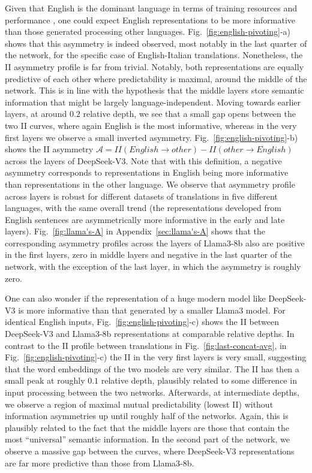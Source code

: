 \documentclass[10pt]{article} %
\begin{document}
Given that English is the dominant language in terms of training resources and performance \citep{Zhu:etal:2024}, one could expect English representations to be more informative than those generated processing other languages.
%
Fig.~\ref{fig:english-pivoting}-a) shows that this asymmetry is indeed observed, most notably in the last quarter of the network, for the specific case of English-Italian translations. 
Nonetheless, the II asymmetry profile is far from trivial. Notably, both representations are equally predictive of each other where predictability is maximal, around the middle of the network. This is in line with the hypothesis that the middle layers store semantic information that might be largely language-independent.  
Moving towards earlier layers, at around $0.2$ relative depth, we see that a small gap opens between the two II curves, where again English is the most informative, whereas in the very first layers we observe a small inverted asymmetry.
Fig.~\ref{fig:english-pivoting}-b) shows the II asymmetry $\mathcal{A} = II(English \rightarrow other) - II(other \rightarrow English)$ across the layers of DeepSeek-V3. Note that with this definition, a negative asymmetry corresponds to representations in English being more informative than representations in the other language. We observe that asymmetry profile across layers is robust for different datasets of translations in five different languages, with the same overall trend (the representations developed from English sentences are asymmetrically more informative in the early and late layers).
%
Fig.~\ref{fig:llama's-A} in Appendix~\ref{sec:llama's-A} shows that the corresponding asymmetry profiles across the layers of Llama3-8b also are positive in the first layers, zero in middle layers and negative in the last quarter of the network, with the exception of the last layer, in which the asymmetry is roughly zero.
%

One can also wonder if the representation of a huge modern model like DeepSeek-V3 is more informative than that generated by a smaller Llama3 model. 
%
For identical English inputs, Fig.~\ref{fig:english-pivoting}-c) shows the II between DeepSeek-V3 and Llama3-8b representations  at comparable relative depths.  In contrast to the II profile between translations in Fig.~\ref{fig:last-concat-avg}, in Fig.~\ref{fig:english-pivoting}-c) the II in the very first layers is very small, suggesting that the word embeddings of the two models are very similar. 
The II has then a small peak at roughly $0.1$ relative depth, plausibly related to some difference in  input processing between the two networks. Afterwards, at intermediate depths, we observe a region of maximal mutual predictability (lowest II) without information asymmetries up until roughly  half of the networks. Again, this is plausibly related to the fact that the middle layers are those that contain the most ``universal'' semantic information. In the second part of the network, we observe a  massive gap between the curves, where DeepSeek-V3 representations are far more predictive than those from Llama3-8b. 
\end{document}
